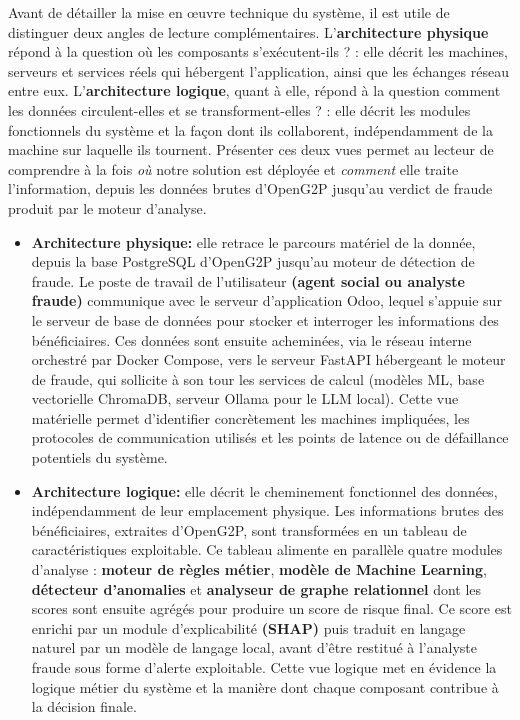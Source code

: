 \documentclass[a4paper, oneside, 12pt]{book}
\begin{document}
\hspace{0.5cm}Avant de détailler la mise en œuvre technique du système, il est utile de distinguer deux angles de lecture complémentaires. L'\textbf{architecture physique} répond à la question \og où les composants s'exécutent-ils ?  : elle décrit les machines, serveurs et services réels qui hébergent l'application, ainsi que les échanges réseau entre eux. L'\textbf{architecture logique}, quant à elle, répond à la question \og comment les données circulent-elles et se transforment-elles ? \fg{} : elle décrit les modules fonctionnels du système et la façon dont ils collaborent, indépendamment de la machine sur laquelle ils tournent. Présenter ces deux vues permet au lecteur de comprendre à la fois \textit{où} notre solution est déployée et \textit{comment} elle traite l'information, depuis les données brutes d'OpenG2P jusqu'au verdict de fraude produit par le moteur d'analyse.
\vspace{0.5cm}
\begin{itemize}[label=\textbullet]

    \item \textbf{Architecture physique:} elle retrace le parcours matériel de la donnée, depuis la base PostgreSQL d'OpenG2P jusqu'au moteur de détection de fraude. Le poste de travail de l'utilisateur \textbf{(agent social ou analyste fraude)} communique avec le serveur d'application Odoo, lequel s'appuie sur le serveur de base de données pour stocker et interroger les informations des bénéficiaires. Ces données sont ensuite acheminées, via le réseau interne orchestré par Docker Compose, vers le serveur FastAPI hébergeant le moteur de fraude, qui sollicite à son tour les services de calcul (modèles ML, base vectorielle ChromaDB, serveur Ollama pour le LLM local). Cette vue matérielle permet d'identifier concrètement les machines impliquées, les protocoles de communication utilisés et les points de latence ou de défaillance potentiels du système.

    \vspace{0.5cm}

    \item \textbf{Architecture logique:} elle décrit le cheminement fonctionnel des données, indépendamment de leur emplacement physique. Les informations brutes des bénéficiaires, extraites d'OpenG2P, sont transformées en un tableau de caractéristiques exploitable. Ce tableau alimente en parallèle quatre modules d'analyse : \textbf{moteur de règles métier}, \textbf{modèle de Machine Learning}, \textbf{détecteur d'anomalies} et \textbf{analyseur de graphe relationnel}  dont les scores sont ensuite agrégés pour produire un score de risque final. Ce score est enrichi par un module d'explicabilité \textbf{(SHAP)} puis traduit en langage naturel par un modèle de langage local, avant d'être restitué à l'analyste fraude sous forme d'alerte exploitable. Cette vue logique met en évidence la logique métier du système et la manière dont chaque composant contribue à la décision finale.

\end{itemize}
\end{document}
